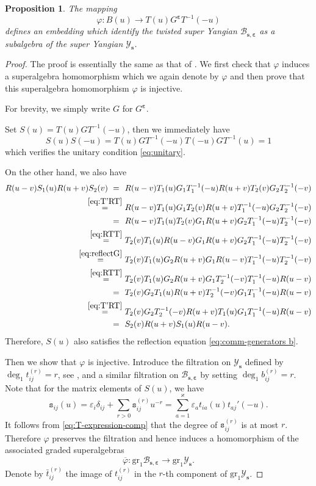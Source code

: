 \documentclass[11pt,reqno]{amsart}
\numberwithin{equation}{section}
\newtheorem{prop}[thm]{Proposition}
\theoremstyle{definition}
\theoremstyle{remark}
\newcommand{\beq}{\begin{equation}}
\newcommand{\eeq}{\end{equation}}
\newcommand{\YMN}{{\mathscr{Y}_{\bm s}}}
\newcommand{\BMN}{{\mathscr{B}_{\bm s,\bm \ve}}}
\newcommand{\ka}{\varkappa}
\newcommand{\ve}{\varepsilon}
\begin{document}
\begin{prop}\label{thm:embedding}
The mapping
\beq\label{eq:emd-b}
\varphi: B(u)\to T(u) G^{\bm\ve}T^{-1}(-u)
\eeq
defines an embedding which identify the twisted super Yangian $\mathscr B_{\bm s,\bm\ve}$ as a subalgebra of the super Yangian $\YMN$.
\end{prop}
\begin{proof}
The proof is essentially the same as that of \cite[Theorem 3.1]{Molev2002reflection}. We first check that $\varphi$ induces a superalgebra homomorphism which we again denote by $\varphi$ and then prove that this superalgebra homomorphism $\varphi$ is injective.

For brevity, we simply write $G$ for $G^{\bm\ve}$.

Set $S(u)= T(u) GT^{-1}(-u)$, then we immediately have
$$
S(u)S(-u)=T(u) GT^{-1}(-u)T(-u) GT^{-1}(u)=1
$$
which verifies the unitary condition \eqref{eq:unitary}.

On the other hand, we also have
\begin{align*}
R(u-v)S_1(u)R(u+v)S_2(v)  \ = \ &\ R(u-v)T_1(u)G_1T_1^{-1}(-u)R(u+v)T_2(v)G_2T_2^{-1}(-v)\\
\stackrel{\eqref{eq:T'RT}}{=}  & \
R(u-v)T_1(u)G_1T_2(v)R(u+v)T_1^{-1}(-u)G_2T_2^{-1}(-v)\\
\ =\ & \
R(u-v)T_1(u)T_2(v)G_1R(u+v)G_2T_1^{-1}(-u)T_2^{-1}(-v)\\
\stackrel{\eqref{eq:RTT}}{=}  & \
T_2(v)T_1(u)R(u-v)G_1R(u+v)G_2T_1^{-1}(-u)T_2^{-1}(-v)\\
\stackrel{\eqref{eq:reflectG}}{=}  & \
T_2(v)T_1(u)G_2R(u+v)G_1R(u-v)T_1^{-1}(-u)T_2^{-1}(-v)\\
\stackrel{\eqref{eq:RTT}}{=}  & \
T_2(v)T_1(u)G_2R(u+v)G_1T_2^{-1}(-v)T_1^{-1}(-u)R(u-v)\\
\ =\ & \
T_2(v)G_2T_1(u)R(u+v)T_2^{-1}(-v)G_1T_1^{-1}(-u)R(u-v)\\
\stackrel{\eqref{eq:T'RT}}{=}  & \
T_2(v)G_2T_2^{-1}(-v)R(u+v)T_1(u)G_1T_1^{-1}(-u)R(u-v)\\
\ =\ & \ S_2(v)R(u+v)S_1(u)R(u-v).
\end{align*}
Therefore, $S(u)$ also satisfies the reflection equation \eqref{eq:comm-generators b}.

Then we show that $\varphi$ is injective. Introduce the filtration on $\YMN$ defined by $\deg_1 t_{ij}^{(r)}=r$, see \cite{Gow2007gauss}, and a similar filtration on $\BMN$ by setting $\deg_1 b_{ij}^{(r)}=r$. Note that for the matrix elements of $S(u)$, we have
\beq\label{eq:embed-expl}
\mathtt s_{ij}(u)=\ve_i\delta_{ij}+\sum_{r>0} \mathtt s_{ij}^{(r)}u^{-r}=\sum_{a=1}^\ka \ve_at_{ia}(u)t_{aj}'(-u).
\eeq
It follows from \eqref{eq:T-expression-comp} that the degree of $\mathtt s_{ij}^{(r)}$ is at most $r$. Therefore $\varphi$ preserves the filtration and hence induces a homomorphism of the associated graded superalgebras
$$
\overline{\varphi}:\mathrm{gr}_1\BMN\to \mathrm{gr}_1\YMN.
$$
Denote by $\bar t_{ij}^{(r)}$ the image of $t_{ij}^{(r)}$ in the $r$-th component of $\mathrm{gr}_1\YMN$.


\end{proof}
\end{document}
